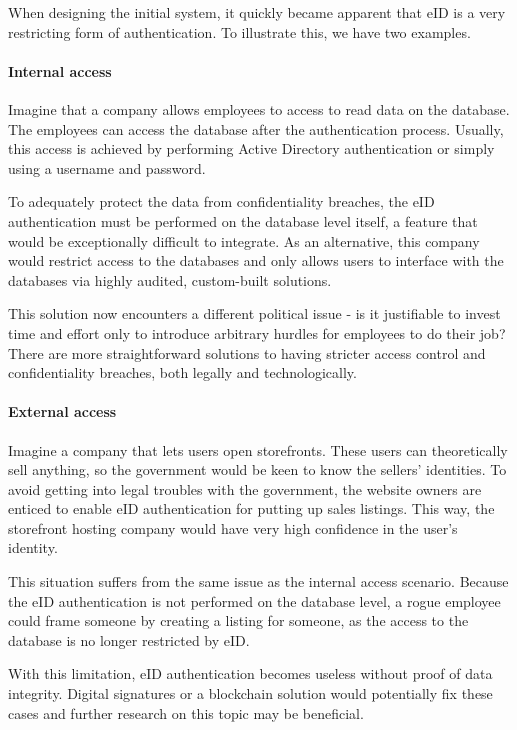 When designing the initial system, it quickly became apparent that eID is a very restricting form of authentication. To illustrate this, we have two examples.

\paragraph{Internal access} Imagine that a company allows employees to access to read data on the database. The employees can access the database after the authentication process. Usually, this access is achieved by performing Active Directory authentication or simply using a username and password.

To adequately protect the data from confidentiality breaches, the eID authentication must be performed on the database level itself, a feature that would be exceptionally difficult to integrate. As an alternative, this company would restrict access to the databases and only allows users to interface with the databases via highly audited, custom-built solutions.

This solution now encounters a different political issue - is it justifiable to invest time and effort only to introduce arbitrary hurdles for employees to do their job? There are more straightforward solutions to having stricter access control and confidentiality breaches, both legally and technologically.

\paragraph{External access}

Imagine a company that lets users open storefronts. These users can theoretically sell anything, so the government would be keen to know the sellers' identities. To avoid getting into legal troubles with the government, the website owners are enticed to enable eID authentication for putting up sales listings. This way, the storefront hosting company would have very high confidence in the user's identity.

This situation suffers from the same issue as the internal access scenario. Because the eID authentication is not performed on the database level, a rogue employee could frame someone by creating a listing for someone, as the access to the database is no longer restricted by eID.

With this limitation, eID authentication becomes useless without proof of data integrity. Digital signatures or a blockchain solution would potentially fix these cases and further research on this topic may be beneficial.

